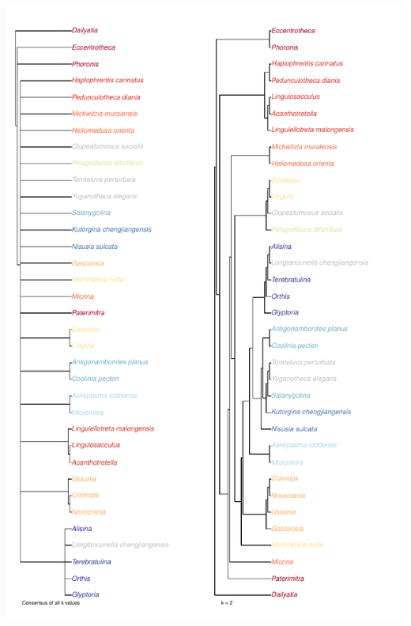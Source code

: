 \documentclass[]{book}
\theoremstyle{definition}
\theoremstyle{definition}
\theoremstyle{definition}
\theoremstyle{remark}
\begin{document}
\includegraphics{Brachiopod_phylogeny_files/figure-latex/unnamed-chunk-6-1.pdf}
\end{document}
